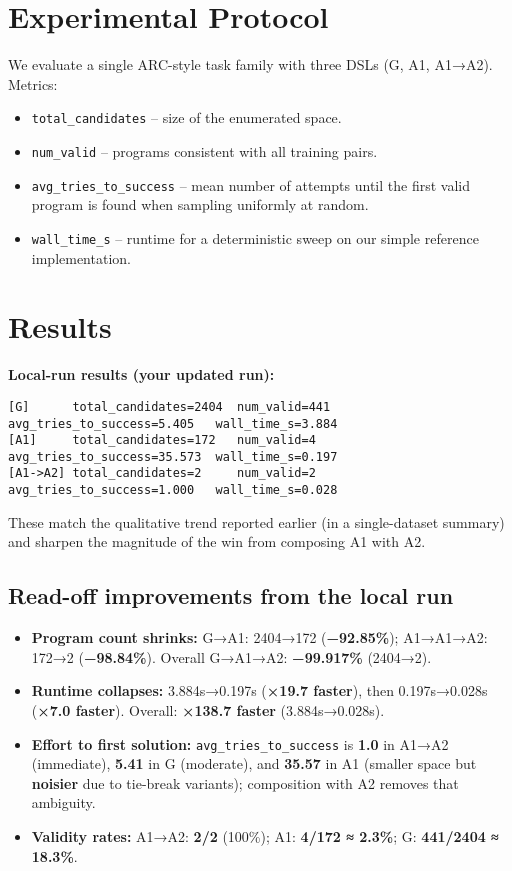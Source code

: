 \documentclass[11pt]{article}
\newcommand{\code}[1]{\texttt{#1}}
\begin{document}
\section{Experimental Protocol}

We evaluate a single ARC-style task family with three DSLs (G, A1, A1→A2). Metrics:
\begin{itemize}
\item \code{total\_candidates} -- size of the enumerated space.
\item \code{num\_valid} -- programs consistent with all training pairs.
\item \code{avg\_tries\_to\_success} -- mean number of attempts until the first valid program is found when sampling uniformly at random.
\item \code{wall\_time\_s} -- runtime for a deterministic sweep on our simple reference implementation.
\end{itemize}

\section{Results}

\textbf{Local-run results (your updated run):}
\begin{lstlisting}
[G]      total_candidates=2404  num_valid=441  avg_tries_to_success=5.405   wall_time_s=3.884
[A1]     total_candidates=172   num_valid=4    avg_tries_to_success=35.573  wall_time_s=0.197
[A1->A2] total_candidates=2     num_valid=2    avg_tries_to_success=1.000   wall_time_s=0.028
\end{lstlisting}

These match the qualitative trend reported earlier (in a single-dataset summary) and sharpen the magnitude of the win from composing A1 with A2.

\subsection{Read-off improvements from the local run}

\begin{itemize}
\item \textbf{Program count shrinks:} G→A1: 2404→172 (\textbf{−92.85\%}); A1→A1→A2: 172→2 (\textbf{−98.84\%}). Overall G→A1→A2: \textbf{−99.917\%} (2404→2).
\item \textbf{Runtime collapses:} 3.884s→0.197s (\textbf{×19.7 faster}), then 0.197s→0.028s (\textbf{×7.0 faster}). Overall: \textbf{×138.7 faster} (3.884s→0.028s).
\item \textbf{Effort to first solution:} \code{avg\_tries\_to\_success} is \textbf{1.0} in A1→A2 (immediate), \textbf{5.41} in G (moderate), and \textbf{35.57} in A1 (smaller space but \textbf{noisier} due to tie-break variants); composition with A2 removes that ambiguity.
\item \textbf{Validity rates:} A1→A2: \textbf{2/2} (100\%); A1: \textbf{4/172 ≈ 2.3\%}; G: \textbf{441/2404 ≈ 18.3\%}.
\end{itemize}
\end{document}
